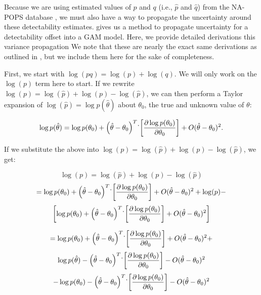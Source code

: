 \par Because we are using estimated values of $p$ and $q$ (i.e., $\hat{p}$ and $\hat{q}$) from the NA-POPS database \citep{edwards_point_2023}, we must also have a way to propagate the uncertainty around these detectability estimates. 
\citet{bravington_variance_2021} gives us a method to propagate uncertainty for a detectability offset into a GAM model. 
Here, we provide detailed derivations this variance propagation
We note that these are nearly the exact same derivations as outlined in \citet{bravington_variance_2021}, but we include them here for the sake of completeness.

\par First, we start with $\log(pq) = \log(p) + \log(q)$.
We will only work on the $\log(p)$ term here to start. 
If we rewrite $\log(p) = \log(\hat{p}) + \log(p) - \log(\hat{p})$, we can then perform a Taylor expansion of $\log(\hat{p}) = \log p(\hat{\theta})$ about $\theta_0$, the true and unknown value of $\theta$:

$$\log p(\hat{\theta}) = \log p(\theta_0) + \left( \hat{\theta} - \theta_0 \right)^T \dot \\ \left[ \dfrac{\partial \log p({\theta_0})}{\partial {\theta_0}}  \right] + O(\hat{\theta} - \theta_0)^2. $$

If we substitute the above into $\log(p) = \log(\hat{p}) + \log(p) - \log(\hat{p})$, we get:

$$	\log(p)  = \log(\hat{p}) + \log(p) - \log(\hat{p}) $$
$$ = \log p(\theta_0) + \left( \hat{\theta} - \theta_0 \right)^T \dot \\ \left[ \dfrac{\partial \log p({\theta_0})}{\partial {\theta_0}}  \right] + O(\hat{\theta} - \theta_0)^2 + \log(p) - $$
$$ \left[ \log p(\theta_0) + \left( \hat{\theta} - \theta_0 \right)^T \dot \\ \left[ \dfrac{\partial \log p({\theta_0})}{\partial {\theta_0}}  \right] + O(\hat{\theta} - \theta_0)^2  \right] $$

$$ = \log p(\theta_0) + \left( \hat{\theta} - \theta_0 \right)^T \dot \\ \left[ \dfrac{\partial \log p({\theta_0})}{\partial {\theta_0}}  \right] + O(\hat{\theta} - \theta_0)^2 + $$
$$\log p(\hat{\theta}) - \left( \hat{\theta} - \theta_0 \right)^T \dot \\ \left[ \dfrac{\partial \log p({\theta_0})}{\partial {\theta_0}}  \right] - O(\hat{\theta} - \theta_0)^2 $$
$$ - \log p(\theta_0) - \left( \hat{\theta} - \theta_0 \right)^T \dot \\ \left[ \dfrac{\partial \log p({\theta_0})}{\partial {\theta_0}}  \right] - O(\hat{\theta} - \theta_0)^2  $$

